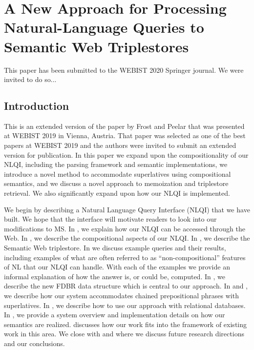 \documentclass[../main.tex]{subfiles}
\begin{document}
\chapter{A New Approach for Processing Natural-Language Queries to Semantic Web Triplestores}
\begin{refsection}

This paper has been submitted to the WEBIST 2020 Springer journal.
We were invited to do so... %

\label{chapter:webist2019journal}

\section{Introduction}
\label{webist2019journal:intro}
This is an extended version of the paper by Frost and Peelar \cite{frostpeelar2019} that was presented at WEBIST 2019 in Vienna, Austria.  That paper was selected as one of the best papers at WEBIST 2019 and the authors were invited to submit an extended version for publication.  In this paper we expand upon the compositionality of our NLQI, including the parsing framework and semantic implementations, we introduce a novel method to accommodate superlatives using compositional semantics, and we discuss a novel approach to memoization and triplestore retrieval.  We also significantly expand upon how our NLQI is implemented.

\noindent We begin by describing a Natural Language Query Interface (NLQI) that we have built. We hope that the interface will motivate readers to look into our modifications to MS. In , we explain how our NLQI can be accessed through the Web. In , we describe the compositional aspects of our NLQI.  In , we describe the Semantic Web triplestore. In  we discuss example queries and their results, including examples of what are often referred to as ``non-compositional'' features of NL that our NLQI can handle. With each of the examples we provide an informal explanation of how the answer is, or could be, computed. In , we describe the new FDBR data structure which is central to our approach. In  and , we describe how our system accommodates chained prepositional phrases with superlatives.  In , we describe how to use our approach with relational databases. In , we provide a system overview and implementation details on how our semantics are realized.  discusses how our work fits into the framework of existing work in this area.  We close with  and  where we discuss future research directions and our conclusions.


\end{refsection}
\end{document}

